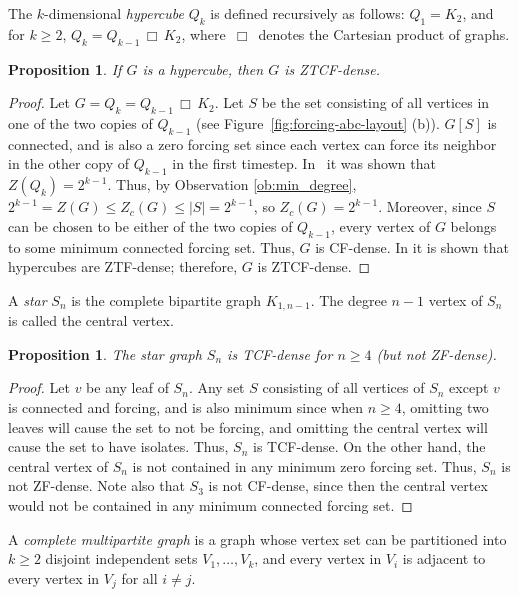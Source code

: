 \documentclass[11pt]{article}
\newtheorem{prop}[thm]{Proposition}
\theoremstyle{definition}
\newcommand{\cprod}{\,\Box\,}
\newcommand{\1}{\vspace{0.1cm}}
\newcommand{\2}{\vspace{0.2cm}}
\newcommand{\3}{\vspace{0.3cm}}
\begin{document}
The $k$-dimensional \emph{hypercube} $ Q_k $ is defined recursively as follows:
$Q_1 = K_2$, and for $ k \ge 2 $, $ Q_k = Q_{k-1} \cprod K_2 $, where $ \cprod $ denotes the Cartesian product of graphs.

\begin{prop}\label{prop:cubes}
If $G$ is a hypercube, then $G$ is ZTCF-dense. 
\end{prop}

\begin{proof}
Let $ G = Q_k = Q_{k-1} \cprod K_2 $. Let $S$ be the set consisting of all vertices in one of the two copies of $ Q_{k-1}$ (see Figure~\ref{fig:forcing-abc-layout} (b)). $G[S]$ is connected, and is also a zero forcing set since each vertex can force its neighbor in the other copy of $Q_{k-1}$ in the first timestep. In~\cite{Pe12} it was shown that $ Z(Q_k) = 2^{k-1} $. Thus, by Observation \ref{ob:min_degree}, $2^{k-1}=Z(G)\leq Z_c(G)\leq |S|= 2^{k-1} $, so $Z_c(G)= 2^{k-1}$. Moreover, since $S$ can be chosen to be either of the two copies of $Q_{k-1}$, every vertex of $G$ belongs to some minimum connected  forcing set. Thus, $ G $ is CF-dense. In \cite{DaHePe2023a} it is shown that hypercubes are ZTF-dense; therefore, $G$ is  ZTCF-dense.
\end{proof}


A \emph{star} $S_n$ is the complete bipartite graph $K_{1,n-1}$. The degree $n-1$ vertex of $S_n$ is called the central vertex.

\begin{prop}\label{prop:star}
The star graph $S_n$ is TCF-dense for $n\geq 4$ (but not ZF-dense). 
\end{prop}
\begin{proof}
Let $v$ be any leaf of $S_n$. Any set $S$ consisting of all vertices of $S_n$ except $v$ is connected and forcing, and is also minimum since when $n\geq 4$, omitting two leaves will cause the set to not be forcing, and omitting the central vertex  will cause the set to have isolates. Thus, $S_n$ is TCF-dense. On the other hand, the central vertex of $S_n$ is not contained in any minimum zero forcing set. Thus, $S_n$ is not ZF-dense. Note also that $S_3$ is not CF-dense, since then the central vertex would not be contained in any minimum connected forcing set.
\end{proof}


A \emph{complete multipartite graph} is a graph whose vertex set can be partitioned into $ k\geq 2 $ disjoint independent sets $ V_1, \ldots, V_k $, and every vertex in $ V_i $ is adjacent to every vertex in $ V_j $ for all $ i \neq j $. 
\end{document}
